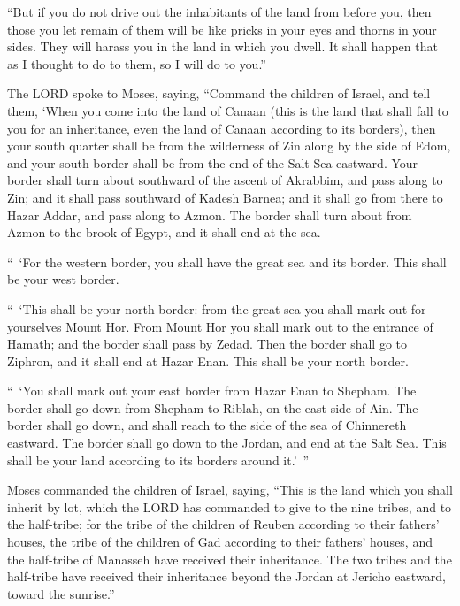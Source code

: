 \myverse{}“But if you do not drive out the inhabitants of the land from
before you, then those you let remain of them will be like pricks in your eyes and thorns in your sides.
They will harass you in the land in which you dwell.
\myverse{}It shall happen that as I thought to do to them, so I will do to you.”


\mychapter{} \myverse*{}The LORD spoke to Moses, saying,
\myverse{}“Command the children of Israel, and tell them, ‘When you come into the land
of Canaan (this is the land that shall fall to you for an inheritance, even the land of Canaan according
to its borders),
\myverse{}then your south quarter shall be from the wilderness of Zin along by the side
of Edom, and your south border shall be from the end of the Salt Sea eastward.
\myverse{}Your border shall turn about southward of the ascent of Akrabbim, and pass
along to Zin; and it shall pass southward of Kadesh Barnea; and it shall go from there to Hazar Addar,
and pass along to Azmon.
\myverse{}The border shall turn about from Azmon to the brook of Egypt, and it shall
end at the sea.


\myverse{}“ ‘For the western border, you shall have the great sea and its
border. This shall be your west border.


\myverse{}“ ‘This shall be your north border: from the great sea you shall
mark out for yourselves Mount Hor.
\myverse{}From Mount Hor you shall mark out to the entrance of Hamath; and the border
shall pass by Zedad.
\myverse{}Then the border shall go to Ziphron, and it shall end at Hazar Enan. This shall
be your north border.


\myverse{}“ ‘You shall mark out your east border from Hazar Enan to Shepham.
\myverse{}The border shall go down from Shepham to Riblah, on the east side of Ain.
The border shall go down, and shall reach to the side of the sea of Chinnereth eastward.
\myverse{}The border shall go down to the Jordan, and end at the Salt Sea. This shall
be your land according to its borders around it.’ ”


\myverse{}Moses commanded the children of Israel, saying, “This is the
land which you shall inherit by lot, which the LORD has commanded to give to the nine tribes, and to the
half-tribe;
\myverse{}for the tribe of the children of Reuben according to their fathers’ houses,
the tribe of the children of Gad according to their fathers’ houses, and the half-tribe of Manasseh have
received their inheritance.
\myverse{}The two tribes and the half-tribe have received their inheritance beyond
the Jordan at Jericho eastward, toward the sunrise.”


